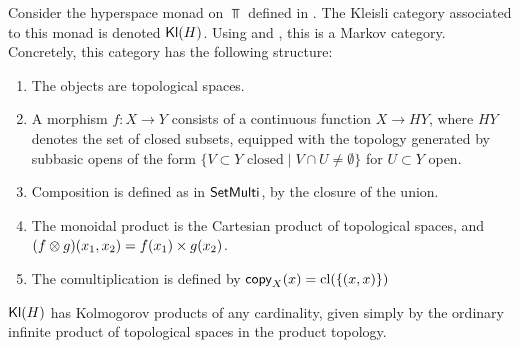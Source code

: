 \documentclass[11pt]{article}
\begin{document}
\begin{definition}
    Consider the hyperspace monad on $\Top$ defined in \cite[Definition~2.4]{hyperspace}.
    The Kleisli category associated to this monad is denoted $\operatorname{\mathsf{Kl}}(H)$.
    Using \cite[Corollary~2.53]{hyperspace} and \cite[Proposition~3.1]{markov_cats}, this is a Markov category.
    Concretely, this category has the following structure:
    \begin{enumerate}
        \item The objects are topological spaces.
        \item A morphism $f: X \to Y$ consists of a continuous function $X \to HY$, where $HY$ denotes the set of closed subsets, equipped with the topology generated by subbasic opens of the form $\{V \subset Y \text{ closed} \mid V \cap U \neq \emptyset\}$ for $U \subset Y$ open.
        \item Composition is defined as in $\operatorname{\mathsf{SetMulti}}$, by the closure of the union.
        \item The monoidal product is the Cartesian product of topological spaces, and $(f \otimes g)(x_1,x_2) = f(x_1) \times g(x_2)$.
        \item The comultiplication is defined by $\mathsf{copy}_{X}(x) = \operatorname{cl}(\{(x,x)\})$
    \end{enumerate}
\end{definition}
\begin{proposition}
    $\operatorname{\mathsf{Kl}}(H)$ has Kolmogorov products of any cardinality, given simply by the ordinary infinite product of topological spaces in the product topology.
\end{proposition}
\end{document}
